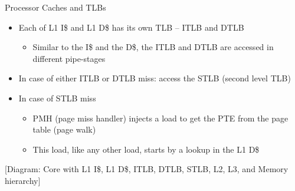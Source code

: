 \documentclass[aspectratio=169,12pt]{beamer}
\begin{document}
\begin{frame}{Processor Caches and TLBs}
\begin{itemize}
\item Each of L1 I\$ and L1 D\$ has its own TLB – ITLB and DTLB
    \begin{itemize}
    \item Similar to the I\$ and the D\$, the ITLB and DTLB are accessed in different pipe-stages
    \end{itemize}
\item In case of either ITLB or DTLB miss: access the STLB (second level TLB)
\item In case of STLB miss
    \begin{itemize}
    \item PMH (page miss handler) injects a load to get the PTE from the page table (page walk)
    \item This load, like any other load, starts by a lookup in the L1 D\$
    \end{itemize}
\end{itemize}
\begin{center}
[Diagram: Core with L1 I\$, L1 D\$, ITLB, DTLB, STLB, L2, L3, and Memory hierarchy]
\end{center}
\end{frame}
\end{document}
